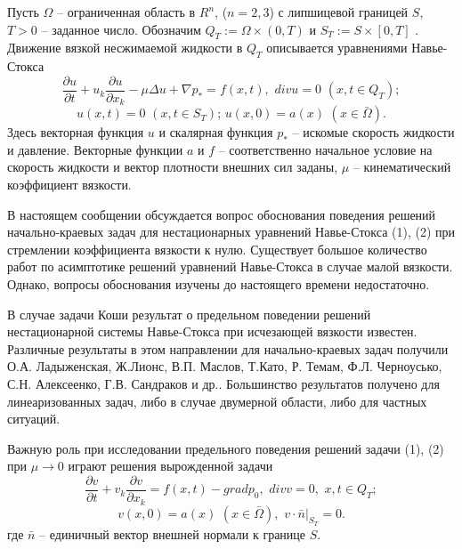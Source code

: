 


\vzmscaption

Пусть  $\Omega$ – ограниченная область в $R^n$, ($n=2, 3$) с липшицевой границей  $S$, $T>0$  -- заданное число. Обозначим $Q_T:=\Omega\times (0, T)$  и $S_T:= S\times [0, T]$ . Движение вязкой несжимаемой жидкости в  $Q_T$ описывается уравнениями Навье-Стокса
\begin{equation}
\frac{\partial u}{\partial t} + u_k\frac{\partial u}{\partial x_k} - \mu\Delta u + \nabla p_{*} = f(x, t),\,\, div u = 0\,\,(x, t\in Q_T);
\end{equation}
\begin{equation}
u(x,t) = 0 \,\,(x,t\in S_T);\,u(x, 0) = a(x)\,\,(x\in\bar{\Omega}).
\end{equation}
Здесь векторная функция  $u$ и скалярная функция $p_{*}$ -- искомые скорость жидкости и давление. Векторные функции  $a$ и  $f$  -- соответственно начальное условие на скорость жидкости и вектор плотности внешних сил заданы,   $\mu$ -- кинематический коэффициент вязкости.

В настоящем сообщении обсуждается вопрос обоснования поведения решений начально-краевых задач для нестационарных уравнений Навье-Стокса (1), (2) при стремлении коэффициента вязкости к нулю. Существует большое количество работ по асимптотике решений уравнений Навье-Стокса в случае малой вязкости. Однако, вопросы обоснования изучены до настоящего времени недостаточно.

В случае задачи Коши результат о предельном поведении решений нестационарной системы Навье-Стокса при исчезающей вязкости известен. Различные результаты в этом направлении для начально-краевых задач получили О.А. Ладыженская, Ж.Лионс, В.П. Маслов, Т.Като, Р. Темам, Ф.Л. Черноусько, С.Н. Алексеенко, Г.В. Сандраков и др.. Большинство результатов получено для линеаризованных задач, либо в случае двумерной области, либо для частных ситуаций.

Важную роль при исследовании предельного поведения решений задачи (1), (2) при  $\mu\rightarrow 0$ играют решения вырожденной задачи
\begin{equation}
\frac{\partial v}{\partial t} + v_k\frac{\partial v}{\partial x_k} = f(x,t) - grad p_0,\,\,div v = 0,\,\, x, t\in Q_T;
\end{equation}
\begin{equation}
v(x,0) = a(x) \,\,(x\in\bar{\Omega}),\,\,v\cdot\bar{n}|_{S_T}=0.
\end{equation}
где $\bar{n}$ -- единичный вектор внешней нормали к границе  $S$.

